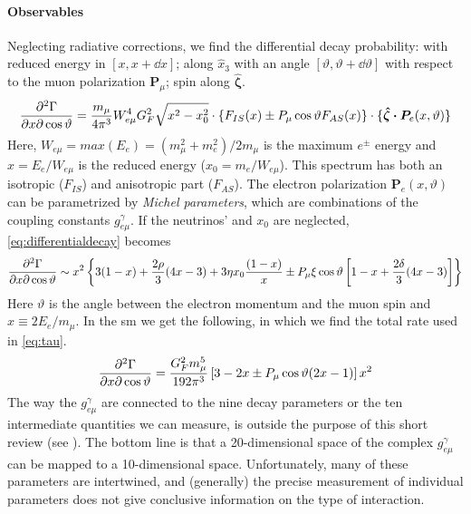 \begin{refsection}
        \paragraph{Observables} 
        Neglecting radiative corrections, we find the differential decay probability: with reduced energy in $[x,x+\dd x]$; along $\hat{x}_3$ with an angle $[\vartheta,\vartheta+\dd\vartheta]$ with respect to the muon polarization $\pmb{P}_\mu$; spin along $\bm{\hat{\zeta}}$.
        \begin{equation}
            \pdv[2]{\Gamma}{x}{\cos\vartheta}=\frac{m_\mu}{4\pi^3}W^4_{e\mu}G^2_F\sqrt{x^2-x_0^2}\cdot \{F_{IS}(x)\pm P_\mu\cos\vartheta F_{AS}(x)\}\cdot\{\bm{\hat{\zeta}\cdot P}_e(x,\vartheta)\}
            \label{eq:differentialdecay}
        \end{equation}
        Here, $W_{e\mu}=max(E_e)=(m_\mu^2+m_e^2)/2m_\mu$ is the maximum $e^\pm$ energy and $x=E_e/W_{e\mu}$ is the reduced energy ($x_0=m_e/W_{e\mu}$).
        This spectrum has both an isotropic ($F_{IS}$) and anisotropic part ($F_{AS}$). 
        The electron polarization $\bm{P}_e(x,\vartheta)$ can be parametrized by \textit{Michel parameters}, which are combinations of the coupling constants $g^\gamma_{e\mu}$.
        If the neutrinos'  and $x_0$ are neglected, \ref{eq:differentialdecay} becomes
        \begin{equation}
            \pdv[2]{\Gamma}{x}{\cos\vartheta}\sim x^2\left\{ 3(1-x)+\frac{2\rho}{3}(4x-3)+3\eta x_0\frac{(1-x)}{x} \pm P_\mu\xi\cos\vartheta  \left[1-x+\frac{2\delta}{3}(4x-3) \right]\right\}
        \end{equation}
        Here $\vartheta$ is the angle between the electron momentum and the muon spin and $x\equiv2E_e/m_\mu$. 
        In the \gls{sm} we get the following, in which we find the total rate used in \ref{eq:tau}. 
        \begin{equation}
            \pdv[2]{\Gamma}{x}{\cos\vartheta}=\frac{G_F^2 m_\mu^5}{192 \pi^3} \left[ 3-2x \pm P_\mu\cos\vartheta (2x-1) \right]x^2
        \end{equation}
        The way the $g^\gamma_{e\mu}$ are connected to the nine decay parameters or the ten intermediate quantities we can measure, is outside the purpose of this short review (see \cite{muondecay:parameters}). 
        The bottom line is that a 20-dimensional space of the complex $g^\gamma_{e\mu}$ can be mapped to a 10-dimensional space.
        Unfortunately, many of these parameters are intertwined, and (generally) the precise measurement of individual parameters does not give conclusive information on the type of interaction.

\end{refsection}
